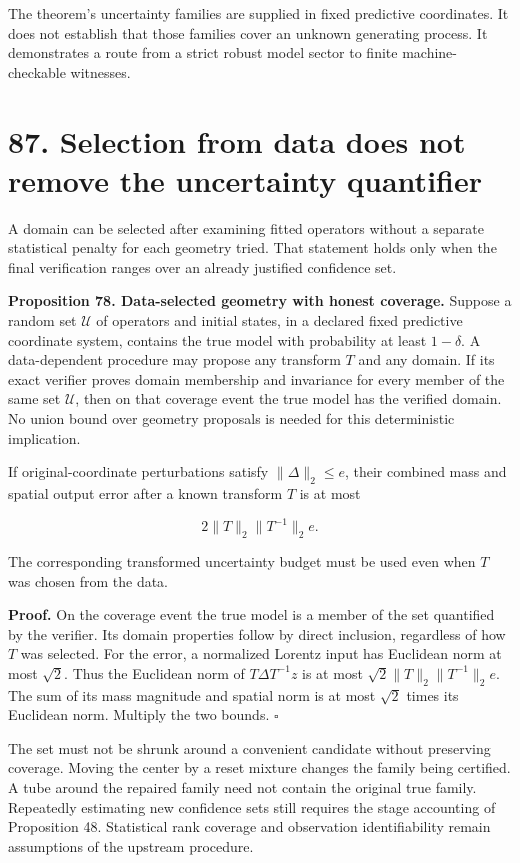 \documentclass[11pt,letterpaper]{article}
\begin{document}
The theorem's uncertainty families are supplied in fixed predictive
coordinates. It does not establish that those families cover an unknown
generating process. It demonstrates a route from a strict robust model
sector to finite machine-checkable witnesses.

\section{87. Selection from data does not remove the uncertainty
quantifier}\label{selection-from-data-does-not-remove-the-uncertainty-quantifier}

A domain can be selected after examining fitted operators without a
separate statistical penalty for each geometry tried. That statement
holds only when the final verification ranges over an already justified
confidence set.

\textbf{Proposition 78. Data-selected geometry with honest coverage.}
Suppose a random set \(\mathcal U\) of operators and initial states, in
a declared fixed predictive coordinate system, contains the true model
with probability at least \(1-\delta\). A data-dependent procedure may
propose any transform \(T\) and any domain. If its exact verifier proves
domain membership and invariance for every member of the same set
\(\mathcal U\), then on that coverage event the true model has the
verified domain. No union bound over geometry proposals is needed for
this deterministic implication.

If original-coordinate perturbations satisfy \(\|\Delta\|_2\leq e\),
their combined mass and spatial output error after a known transform
\(T\) is at most

\[
\boxed{2\|T\|_2\|T^{-1}\|_2 e.}
\]

The corresponding transformed uncertainty budget must be used even when
\(T\) was chosen from the data.

\textbf{Proof.} On the coverage event the true model is a member of the
set quantified by the verifier. Its domain properties follow by direct
inclusion, regardless of how \(T\) was selected. For the error, a
normalized Lorentz input has Euclidean norm at most \(\sqrt2\). Thus the
Euclidean norm of \(T\Delta T^{-1}z\) is at most
\(\sqrt2\|T\|_2\|T^{-1}\|_2e\). The sum of its mass magnitude and
spatial norm is at most \(\sqrt2\) times its Euclidean norm. Multiply
the two bounds. \(\square\)

The set must not be shrunk around a convenient candidate without
preserving coverage. Moving the center by a reset mixture changes the
family being certified. A tube around the repaired family need not
contain the original true family. Repeatedly estimating new confidence
sets still requires the stage accounting of Proposition 48. Statistical
rank coverage and observation identifiability remain assumptions of the
upstream procedure.
\end{document}
